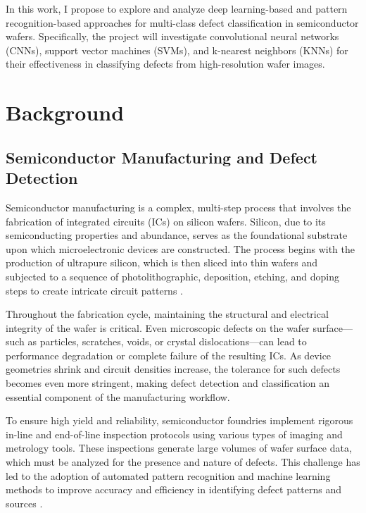 \documentclass[conference]{IEEEtran}
\begin{document}
In this work, I propose to explore and analyze deep learning-based and pattern recognition-based approaches for multi-class defect classification in semiconductor wafers. 
Specifically, the project will investigate convolutional neural networks (CNNs), support vector machines (SVMs), and k-nearest neighbors (KNNs) for their effectiveness in classifying defects from high-resolution wafer images. 

\section{Background}
\subsection{Semiconductor Manufacturing and Defect Detection} 
Semiconductor manufacturing is a complex, multi-step process that involves the fabrication of integrated circuits (ICs) on silicon wafers. 
Silicon, due to its semiconducting properties and abundance, serves as the foundational substrate upon which microelectronic devices are constructed. 
The process begins with the production of ultrapure silicon, which is then sliced into thin wafers and subjected to a sequence of photolithographic, deposition, etching, and doping steps to create intricate circuit patterns \cite{bg1}.

Throughout the fabrication cycle, maintaining the structural and electrical integrity of the wafer is critical. 
Even microscopic defects on the wafer surface—such as particles, scratches, voids, or crystal dislocations—can lead to performance degradation or complete failure of the resulting ICs. 
As device geometries shrink and circuit densities increase, the tolerance for such defects becomes even more stringent, making defect detection and classification an essential component of the manufacturing workflow.

To ensure high yield and reliability, semiconductor foundries implement rigorous in-line and end-of-line inspection protocols using various types of imaging and metrology tools. 
These inspections generate large volumes of wafer surface data, which must be analyzed for the presence and nature of defects. 
This challenge has led to the adoption of automated pattern recognition and machine learning methods to improve accuracy and efficiency in identifying defect patterns and sources \cite{bg2}.
\end{document}
